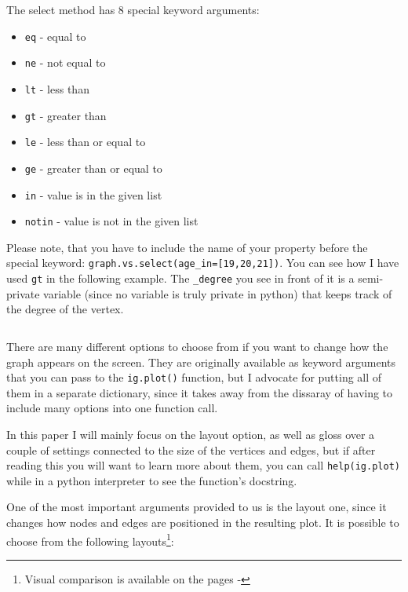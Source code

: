 \documentclass[12pt, a4paper]{article}
\begin{document}
The select method has 8 special keyword arguments:
\begin{multicols}{2}
  \begin{itemize}
  \item \texttt{eq} - equal to
  \item \texttt{ne} - not equal to
  \item \texttt{lt} - less than
  \item \texttt{gt} - greater than
  \item \texttt{le} - less than or equal to
  \item \texttt{ge} - greater than or equal to
  \item \texttt{in} - value is in the given list
  \item \texttt{notin} - value is not in the given list
  \end{itemize}
\end{multicols}

Please note, that you have to include the name of your property before the special keyword: \texttt{graph.vs.select(age\_in=[19,20,21])}. You can see how I have used \texttt{gt} in the following example. The \texttt{\_degree} you see in front of it is a semi-private variable (since no variable is truly private in python) that keeps track of the degree of the vertex.

\bgroup
  \inputminted[linenos, breaklines=true, fontsize=\scriptsize]{python}{src/youtube/hdg/1_selecting.py}
  \label{listing:iplot_1sel}
\egroup


There are many different options to choose from if you want to change how the graph appears on the screen. They are originally available as keyword arguments that you can pass to the \texttt{ig.plot()} function, but I advocate for putting all of them in a separate dictionary, since it takes away from the dissaray of having to include many options into one function call.

In this paper I will mainly focus on the layout option, as well as gloss over a couple of settings connected to the size of the vertices and edges, but if after reading this you will want to learn more about them, you can call \texttt{help(ig.plot)} while in a python interpreter to see the function's docstring.

One of the most important arguments provided to us is the layout one, since it changes how nodes and edges are positioned in the resulting plot. It is possible to choose from the following layouts\footnote{Visual comparison is available on the pages \pageref{fig:hdg_c1}-\pageref{fig:hdg_c9}}:
\end{document}
